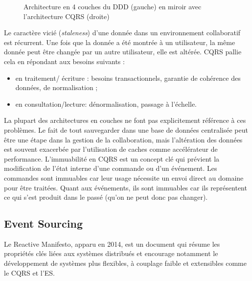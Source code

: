 \begin{figure}[ht]
	\noindent
	\centering
	\caption{Architecture en 4 couches du DDD (gauche) en miroir avec 
		l'architecture CQRS 
		(droite)}
	\label{fig:dddcqrs}
\end{figure}


Le caractère vicié (\textit{staleness}) d'une donnée dans un environnement 
collaboratif est récurrent. Une fois que la donnée a été montrée à un utilisateur, la 
même donnée peut être changée par un autre utilisateur, elle est altérée. 
\gls{CQRS} pallie cela en répondant aux besoins suivants :
\begin{itemize}
	\item en traitement/ écriture : besoins transactionnels, garantie de cohérence 
	des données, de normalisation ;
	\item en consultation/lecture: dénormalisation, passage à l'échelle.
\end{itemize}

La plupart des architectures en couches ne font pas explicitement référence à ces 
problèmes. Le fait de tout sauvegarder dans une base de données centralisée peut 
être une étape dans la gestion de la collaboration, mais l'altération des données est 
souvent exacerbée par l'utilisation de caches comme accélérateur de performance.
L'immuabilité en \gls{CQRS} est un concept clé qui prévient la  
modification de l'état interne d'une commande ou d'un événement. Les 
commandes sont immuables car leur usage nécessite un envoi direct au domaine 
pour être traitées. Quant aux événements, ils sont immuables car ils représentent 
ce qui s'est produit dans le passé (qu'on ne peut donc pas changer). 

\subsection{Event Sourcing}
\label{sec:es}

Le Reactive Manifesto, apparu en 2014, est un document qui résume les 
propriétés clés liées aux systèmes distribués et encourage notamment le 
développement de systèmes \og plus flexibles, à couplage faible et 
extensibles\fg{}\cite{Boner2014TheManifesto} comme le \gls{CQRS} et l'\gls{ES}.

